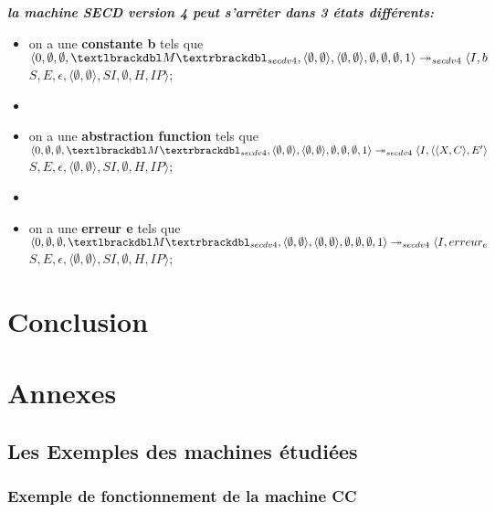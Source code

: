 \documentclass[10pt,a4paper]{article}
\begin{document}
			
			\textbf{\textit{la machine SECD version 4 peut s'arrêter dans 3 états différents:}}
			\smallbreak
			\begin{itemize}
				\item[] on a une \textbf{constante b} tels que $\langle 0,\emptyset,\emptyset,\textlbrackdbl M\textrbrackdbl_{secdv4},\langle\emptyset,\emptyset\rangle,\langle\emptyset,\emptyset\rangle,\emptyset,\emptyset,\emptyset,1\rangle \\
				\twoheadrightarrow_{secdv4} \langle I,b$ $S,E,\epsilon,\langle\emptyset,\emptyset\rangle,SI,\emptyset,H,IP\rangle$;
				\item[] 
				\item[] on a une \textbf{abstraction function} tels que
				$\langle 0,\emptyset,\emptyset,\textlbrackdbl M\textrbrackdbl_{secdv4},\langle\emptyset,\emptyset\rangle,\langle\emptyset,\emptyset\rangle,\emptyset,\emptyset,\emptyset,1\rangle \\
				\twoheadrightarrow_{secdv4} \langle I,\langle\langle X,C\rangle,E'\rangle$ $S,E,\epsilon,\langle\emptyset,\emptyset\rangle,SI,\emptyset,H,IP\rangle$;
				\item[] 
				\item[] on a une \textbf{erreur e} tels que 
				$\langle 0,\emptyset,\emptyset,\textlbrackdbl M\textrbrackdbl_{secdv4},\langle\emptyset,\emptyset\rangle,\langle\emptyset,\emptyset\rangle,\emptyset,\emptyset,\emptyset,1\rangle \\
				\twoheadrightarrow_{secdv4} \langle I,erreur_{e}$ $S,E,\epsilon,\langle\emptyset,\emptyset\rangle,SI,\emptyset,H,IP\rangle$;
			\end{itemize}
		\newpage
		\section{Conclusion}
		
		\newpage
		
		\section{Annexes}
			\subsection{Les Exemples des machines étudiées}
				\subsubsection{Exemple de fonctionnement de la machine CC}\label{CC}
			
\end{document}

